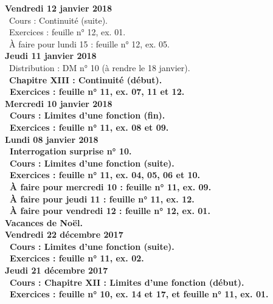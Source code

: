 \documentclass[12pt,a4paper]{article}
\begin{document}
\noindent\textbf{Vendredi 12 janvier 2018}\\
\bu\ Cours : Continuité (suite).\\
\bu\ Exercices : feuille n° 12, ex. 01.\\
\bu\ À faire pour lundi 15 : feuille n° 12, ex. 05.\vspace{.4cm}\\

\noindent\textbf{Jeudi 11 janvier 2018}\\
\bu\ Distribution : DM n° 10 (à rendre le 18 janvier).\\
\bu\ \bf Chapitre XIII \rm : Continuité (début).\\
\bu\ Exercices : feuille n° 11, ex. 07, 11 et 12.\vspace{.4cm}\\

\noindent\textbf{Mercredi 10 janvier 2018} \\
\bu\ Cours : Limites d'une fonction (fin).\\
\bu\ Exercices : feuille n° 11, ex. 08 et 09.\vspace{.4cm}\\

\noindent\textbf{Lundi 08 janvier 2018} \\
\bu\ Interrogation surprise n° 10.\\
\bu\ Cours : Limites d'une fonction (suite).\\
\bu\ Exercices : feuille n° 11, ex. 04, 05, 06 et 10.\\
\bu\ À faire pour mercredi 10 : feuille n° 11, ex. 09.\\
\bu\ À faire pour jeudi 11 : feuille n° 11, ex. 12.\\
\bu\ À faire pour vendredi 12 : feuille n° 12, ex. 01.\vspace{.4cm}\\

\noindent\textbf{\bf Vacances de Noël}.\vspace{.4cm}\\

\noindent\textbf{Vendredi 22 décembre 2017}\\ 
\bu\ Cours : Limites d'une fonction (suite).\\
\bu\ Exercices : feuille n° 11, ex. 02.\vspace{.4cm}\\

\noindent\textbf{Jeudi 21 décembre 2017}\\
\bu\ Cours : \bf Chapitre XII \rm : Limites d'une fonction (début).\\
\bu\ Exercices : feuille n° 10, ex. 14 et 17, et feuille n° 11, ex. 01.\vspace{.4cm}\\
\end{document}
